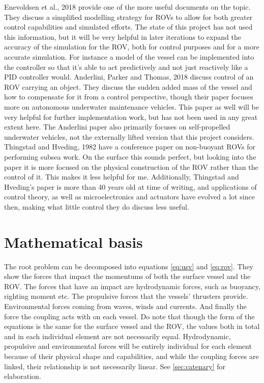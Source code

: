 Enevoldsen et al., 2018 \cite{enevoldsen_simplified_2018} provide one of the more useful documents on the topic. They discuss a simplified modelling strategy for ROVs to allow for both greater control capabilities and simulated efforts. The state of this project has not used this information, but it will be very helpful in later iterations to expand the accuracy of the simulation for the ROV, both for control purposes and for a more accurate simulation. For instance a model of the vessel can be implemented into the controller so that it's able to act predictively and not just reactively like a PID controller would. Anderlini, Parker and Thomas, 2018 \cite{anderlini_control_2018} discuss control of an ROV carrying an object. They discuss the sudden added mass of the vessel and how to compensate for it from a control perspective, though their paper focuses more on autonomous underwater maintenance vehicles. This paper as well will be very helpful for further implementation work, but has not been used in any great extent here. The Anderlini paper also primarily focuses on self-propelled underwater vehicles, not the externally lifted version that this project considers. Thingstad and Hveding, 1982 \cite{thingstad_nonbuoyant_1982} have a conference paper on non-buoyant ROVs for performing subsea work. On the surface this sounds perfect, but looking into the paper it is more focused on the physical construction of the ROV rather than the control of it. This makes it less helpful for me. Additionally, Thingstad and Hveding's paper is more than 40 years old at time of writing, and applications of control theory, as well as microelectronics and actuators have evolved a lot since then, making what little control they do discuss less useful.

\section{Mathematical basis}
\label{sec:math}
The root problem can be decomposed into equations \ref{eq:usv} and \ref{eq:rov}. They show the forces that impact the momentums of both the surface vessel and the ROV. The forces that have an impact are hydrodynamic forces, such as buoyancy, righting moment etc. The propulsive forces that the vessels' thrusters provide. Environmental forces coming from waves, winds and currents. And finally the force the coupling acts with on each vessel. Do note that though the form of the equations is the same for the surface vessel and the ROV, the values both in total and in each individual element are not necessarily equal. Hydrodynamic, propulsive and environmental forces will be entirely individual for each element because of their physical shape and capabilities, and while the coupling forces are linked, their relationship is not necessarily linear. See \cref{sec:catenary} for elaboration.

